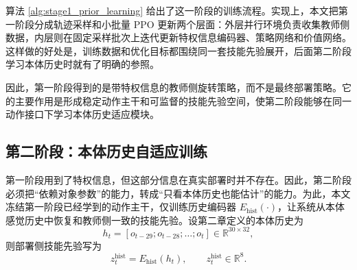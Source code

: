 算法 \ref{alg:stage1_prior_learning} 给出了这一阶段的训练流程。实现上，本文把第一阶段分成轨迹采样和小批量 PPO 更新两个层面：外层并行环境负责收集教师侧数据，内层则在固定采样批次上迭代更新特权信息编码器、策略网络和价值网络。这样做的好处是，训练数据和优化目标都围绕同一套技能先验展开，后面第二阶段学习本体历史时就有了明确的参照。

\begin{algorithm}[H]
  \DontPrintSemicolon
  \caption{第一阶段旋转技能先验学习}
  \label{alg:stage1_prior_learning}
  \BlankLine
\end{algorithm}

因此，第一阶段得到的是带特权信息的教师侧旋转策略，而不是最终部署策略。它的主要作用是形成稳定动作主干和可监督的技能先验空间，使第二阶段能够在同一动作接口下学习本体历史适应模块。

\subsection{第二阶段：本体历史自适应训练}
\thesisbodyfont
第一阶段用到了特权信息，但这部分信息在真实部署时并不存在。因此，第二阶段必须把“依赖对象参数”的能力，转成“只看本体历史也能估计”的能力。为此，本文冻结第一阶段已经学到的动作主干，仅训练历史编码器 \(E_{\mathrm{hist}}(\cdot)\)，让系统从本体感觉历史中恢复和教师侧一致的技能先验。设第二章定义的本体历史为
\begin{equation}
h_t =
\left[
o_{t-29};o_{t-28};\ldots;o_t
\right]
\in \mathbb{R}^{30\times 32},
\end{equation}
则部署侧技能先验写为
\begin{equation}
z_t^{\mathrm{hist}} = E_{\mathrm{hist}}(h_t), \qquad z_t^{\mathrm{hist}} \in \mathbb{R}^{8}.
\end{equation}

